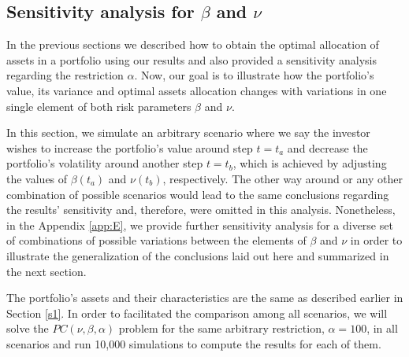 \subsection{Sensitivity analysis for $\beta$ and $\nu$} \label{specific}

In the previous sections we described how to obtain the optimal allocation of assets in a portfolio using our results and also provided a sensitivity analysis regarding the restriction $\alpha$. Now, our goal is to illustrate how the portfolio's value, its variance and optimal assets allocation changes with variations in one single element of both risk parameters $\beta$ and $\nu$.

In this section, we simulate an arbitrary scenario where we say the investor wishes to increase the portfolio's value around step $t=t_a$ and decrease the portfolio's volatility around another step $t=t_b$, which is achieved by adjusting the values of $\beta(t_a)$ and $\nu(t_b)$, respectively. The other way around or any other combination of possible scenarios would lead to the same conclusions regarding the results' sensitivity and, therefore, were omitted in this analysis. Nonetheless, in the Appendix \ref{app:E}, we provide further sensitivity analysis for a diverse set of combinations of possible variations between the elements of $\beta$ and $\nu$ in order to illustrate the generalization of the conclusions laid out here and summarized in the next section.

The portfolio's assets and their characteristics are the same as described earlier in Section \ref{s1}. In order to facilitated the comparison among all scenarios, we will solve the $PC(\nu,\beta,\alpha)$ problem for the same arbitrary restriction, $\alpha=100$, in all scenarios and run  10,000 simulations to compute the results for each of them.

